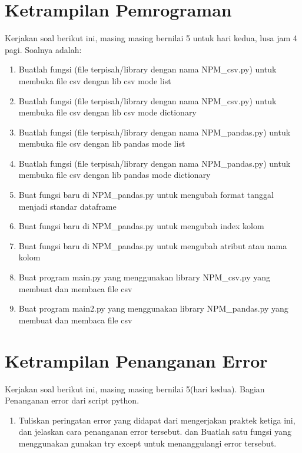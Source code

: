 \section{Ketrampilan Pemrograman}
Kerjakan soal berikut ini, masing masing bernilai 5 untuk hari kedua, lusa jam 4 pagi. Soalnya adalah:

\begin{enumerate}
\item
Buatlah fungsi (file terpisah/library dengan nama NPM\_csv.py) untuk membuka file csv dengan lib csv mode list
\item
Buatlah fungsi (file terpisah/library dengan nama NPM\_csv.py) untuk membuka file csv dengan lib csv mode dictionary
\item
Buatlah fungsi (file terpisah/library dengan nama NPM\_pandas.py) untuk membuka file csv dengan lib pandas mode list
\item
Buatlah fungsi (file terpisah/library dengan nama NPM\_pandas.py) untuk membuka file csv dengan lib pandas mode dictionary
\item
Buat fungsi baru di NPM\_pandas.py untuk mengubah format tanggal menjadi standar dataframe
\item
Buat fungsi baru di NPM\_pandas.py untuk mengubah index kolom
\item
Buat fungsi baru di NPM\_pandas.py untuk mengubah atribut atau nama kolom
\item
Buat program main.py yang menggunakan library NPM\_csv.py yang membuat dan membaca file csv
\item
Buat program main2.py yang menggunakan library NPM\_pandas.py yang membuat dan membaca file csv
\end{enumerate}




\section{Ketrampilan Penanganan Error}
Kerjakan soal berikut ini, masing masing bernilai 5(hari kedua). Bagian Penanganan error dari script python.
\begin{enumerate}
\item
Tuliskan peringatan error yang didapat dari mengerjakan praktek ketiga ini, dan jelaskan cara penanganan error tersebut.
dan Buatlah satu fungsi yang menggunakan gunakan try except untuk menanggulangi error tersebut.
\end{enumerate}




